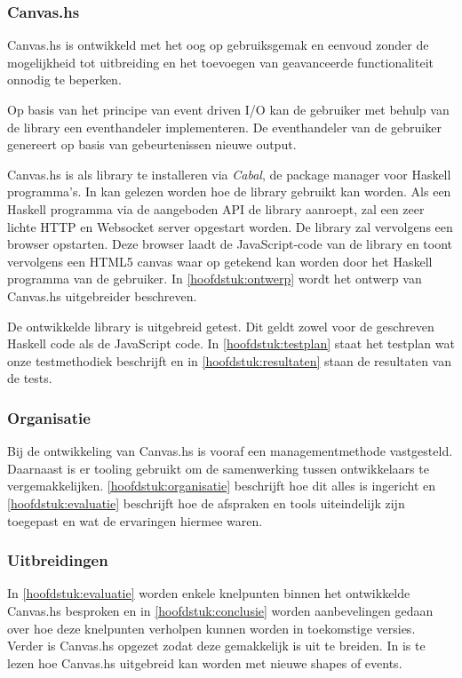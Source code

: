 \subsubsection{Canvas.hs}
Canvas.hs is ontwikkeld met het oog op gebruiksgemak en eenvoud zonder de mogelijkheid tot uitbreiding en het toevoegen van geavanceerde functionaliteit onnodig te beperken. 

Op basis van het principe van event driven I/O kan de gebruiker met behulp van de library een eventhandeler implementeren. De eventhandeler van de gebruiker genereert op basis van gebeurtenissen nieuwe output.

Canvas.hs is als library te installeren via \emph{Cabal}, de package manager voor Haskell programma's. In  kan gelezen worden hoe de library gebruikt kan worden. Als een Haskell programma via de aangeboden API de library aanroept, zal een zeer lichte HTTP en Websocket server opgestart worden. De library zal vervolgens een browser opstarten. Deze browser laadt de JavaScript-code van de library en toont vervolgens een HTML5 canvas waar op getekend kan worden door het Haskell programma van de gebruiker. In \autoref{hoofdstuk:ontwerp} wordt het ontwerp van Canvas.hs uitgebreider beschreven.

De ontwikkelde library is uitgebreid getest. Dit geldt zowel voor de geschreven Haskell code als de JavaScript code. In \autoref{hoofdstuk:testplan} staat het testplan wat onze testmethodiek beschrijft en in \autoref{hoofdstuk:resultaten} staan de resultaten van de tests.

\subsubsection{Organisatie}
Bij de ontwikkeling van Canvas.hs is vooraf een managementmethode vastgesteld. Daarnaast is er tooling gebruikt om de samenwerking tussen ontwikkelaars te vergemakkelijken. \autoref{hoofdstuk:organisatie} beschrijft hoe dit alles is ingericht en \autoref{hoofdstuk:evaluatie} beschrijft hoe de afspraken en tools uiteindelijk zijn toegepast en wat de ervaringen hiermee waren.

\subsubsection{Uitbreidingen}
In \autoref{hoofdstuk:evaluatie} worden enkele knelpunten binnen het ontwikkelde Canvas.hs besproken en in \autoref{hoofdstuk:conclusie} worden aanbevelingen gedaan over hoe deze knelpunten verholpen kunnen worden in toekomstige versies. Verder is Canvas.hs opgezet zodat deze gemakkelijk is uit te breiden. In  is te lezen hoe Canvas.hs uitgebreid kan worden met nieuwe shapes of events.


